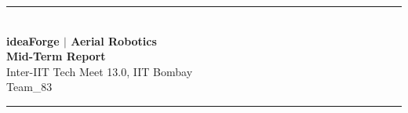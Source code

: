 \documentclass[12pt]{report}
\begin{document}
\begin{titlepage}
    \begin{center}
        \hfill\rule{1\textwidth}{1.5pt}\hfill \\[4.5cm]
        {\Huge \textbf{ideaForge $|$ Aerial Robotics}}\\[1.5cm]
        {\LARGE \textbf{Mid-Term Report}}\\[0.5cm]
        {\Large Inter-IIT Tech Meet 13.0, IIT Bombay}\\[1.5cm]
        {\Large Team\_83}\\[3cm]
        \vfill
        \hfill\rule{1\textwidth}{1.5pt}\hfill \\[0.05cm]
    \end{center}
\end{titlepage}

\tableofcontents







\end{document}
